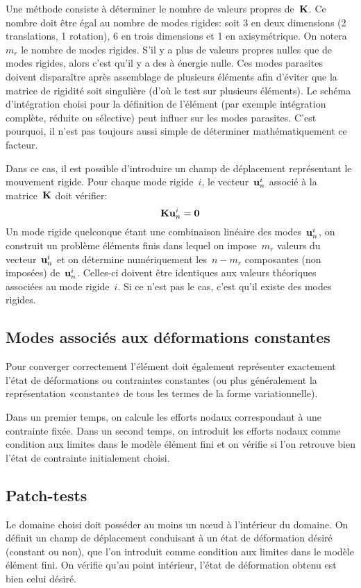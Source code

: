 \medskip
Une méthode consiste à déterminer le nombre de valeurs propres  de~$\MM{K}$.
Ce nombre doit être égal au nombre de modes rigides: soit 3 en deux dimensions (2 translations, 1 rotation),
6 en trois dimensions et 1 en axisymétrique. On notera~$m_r$ le nombre de modes rigides.
S'il y a plus de valeurs propres nulles que de modes rigides, alors c'est qu'il y a des
 à énergie nulle.
Ces modes parasites doivent disparaître après assemblage de plusieurs éléments
afin d'éviter que la matrice de rigidité soit singulière (d'où le test sur plusieurs éléments).
Le schéma d'intégration choisi pour la définition de l'élément (par exemple intégration
complète, réduite ou sélective) peut influer sur les modes parasites.
C'est pourquoi, il n'est pas toujours aussi simple de déterminer mathématiquement
ce facteur.

\medskip
Dans ce cas, il est possible d'introduire un champ de déplacement représentant le
mouvement rigide.
Pour chaque mode rigide~$i$, le vecteur~$\VV{u}^i_n$ associé à la matrice~$\MM{K}$ doit
vérifier:
\begin{equation}\MM{K}\VV{u}^i_n=\VV{0}\end{equation}
Un mode rigide quelconque étant une combinaison linéaire des modes~$\VV{u}^i_n$,
on construit un problème éléments finis dans lequel on impose~$m_r$ valeurs du vecteur~$\VV{u}^i_n$
et on détermine numériquement les~$n-m_r$ composantes (non imposées) de~$\VV{u}^i_n$.
Celles-ci doivent être identiques aux valeurs théoriques associées au mode
rigide~$i$. Si ce n'est pas le cas, c'est qu'il existe des modes rigides.
\medskip
\subsection{Modes associés aux déformations constantes}
Pour converger correctement l'élément doit également représenter
exactement l'état de déformations ou contraintes constantes (ou plus
généralement la représentation «constante» de tous les termes de la
forme variationnelle).

Dans un premier temps, on calcule les efforts nodaux correspondant à une contrainte fixée.
Dans un second temps, on introduit les efforts nodaux comme condition aux limites dans le modèle
élément fini et on vérifie si l'on retrouve bien l'état de contrainte initialement choisi.

\medskip
\subsection{Patch-tests}
Le domaine choisi doit posséder au moins un nœud à l'intérieur du domaine.
On définit un champ de déplacement conduisant à un état de déformation
désiré (constant ou non), que l'on introduit comme condition aux limites dans le modèle élément fini.
On vérifie qu'au point intérieur, l'état de déformation obtenu est bien celui
désiré.


